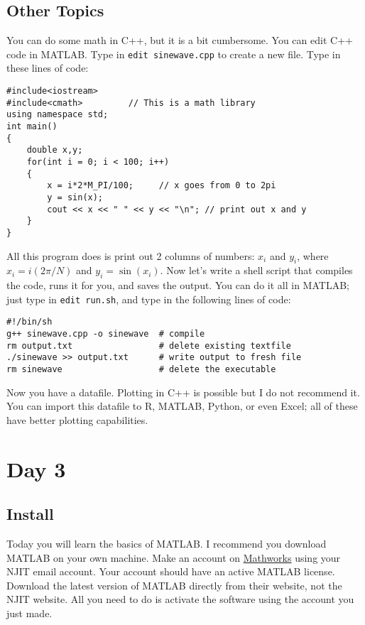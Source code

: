 \documentclass{article}
\begin{document}
\subsection{Other Topics}
You can do some math in C++, but it is a bit cumbersome. You can edit C++ code in MATLAB. Type in \texttt{edit sinewave.cpp} to create a new file. Type in these lines of code:
\begin{verbatim}
#include<iostream>
#include<cmath>         // This is a math library
using namespace std;
int main()
{
    double x,y;
    for(int i = 0; i < 100; i++)
    {
        x = i*2*M_PI/100;     // x goes from 0 to 2pi
        y = sin(x);
        cout << x << " " << y << "\n"; // print out x and y
    }
}
\end{verbatim}
All this program does is print out 2 columns of numbers: $x_i$ and $y_i$, where $x_i = i(2\pi/N)$ and $y_i = \sin(x_i)$. Now let's write a shell script that compiles the code, runs it for you, and saves the output. You can do it all in MATLAB; just type in \texttt{edit run.sh}, and type in the following lines of code:
\begin{verbatim}
#!/bin/sh
g++ sinewave.cpp -o sinewave  # compile
rm output.txt                 # delete existing textfile
./sinewave >> output.txt      # write output to fresh file
rm sinewave                   # delete the executable
\end{verbatim}
Now you have a datafile. Plotting in C++ is possible but I do not recommend it. You can import this datafile to R, MATLAB, Python, or even Excel; all of these have better plotting capabilities.



\section{Day 3}
\subsection{Install}
Today you will learn the basics of MATLAB. I recommend you download MATLAB on your own machine. Make an account on \href{https://www.mathworks.com/}{Mathworks} using your NJIT email account. Your account should have an active MATLAB license. Download the latest version of MATLAB directly from their website, not the NJIT website. All you need to do is activate the software using the account you just made.
\end{document}
